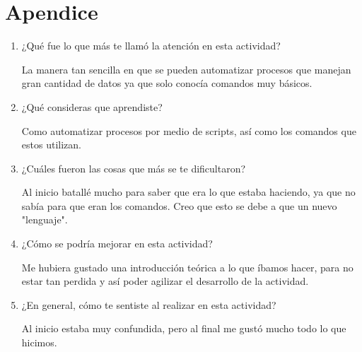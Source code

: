 \documentclass{article}
\begin{document}
\section{Apendice}
\begin{enumerate}
\item¿Qué fue lo que más te llamó la atención en esta actividad?

La manera tan sencilla en que se pueden automatizar procesos que manejan gran cantidad de datos  ya que solo conocía comandos muy básicos.

\item¿Qué consideras que aprendiste?

Como automatizar procesos por medio de scripts, así como los comandos que estos utilizan.

\item¿Cuáles fueron las cosas que más se te dificultaron?

Al inicio batallé mucho para saber que era lo que estaba haciendo, ya que no sabía para que eran los comandos. Creo que esto se debe a que un nuevo "lenguaje".

\item¿Cómo se podría mejorar en esta actividad?

Me hubiera gustado una introducción teórica a lo que íbamos  hacer, para no estar tan perdida y así poder agilizar el desarrollo de la actividad.

\item¿En general, cómo te sentiste al realizar en esta actividad?

Al inicio estaba muy confundida, pero al final me gustó mucho todo lo que hicimos.

\end{enumerate}
\end{document}
